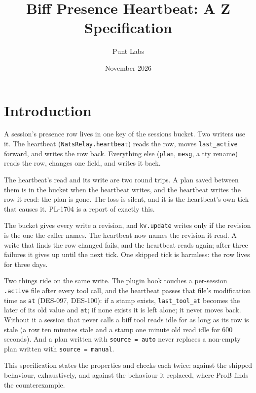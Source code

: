 \documentclass[a4paper,10pt,fleqn]{article}
\begin{document}
\title{Biff Presence Heartbeat: A Z Specification}
\author{Punt Labs}
\date{November 2026}
\maketitle

\section{Introduction}

A session's presence row lives in one key of the sessions bucket.  Two
writers use it.  The heartbeat (\texttt{NatsRelay.heartbeat}) reads the row,
moves \texttt{last\_active} forward, and writes the row back.  Everything
else (\texttt{plan}, \texttt{mesg}, a tty rename) reads the row, changes one
field, and writes it back.

The heartbeat's read and its write are two round trips.  A plan saved
between them is in the bucket when the heartbeat writes, and the heartbeat
writes the row it read: the plan is gone.  The loss is silent, and it is
the heartbeat's own tick that causes it.  PL-1704 is a report of exactly this.

The bucket gives every write a revision, and \texttt{kv.update} writes only
if the revision is the one the caller names.  The heartbeat now names the
revision it read.  A write that finds the row changed fails, and the
heartbeat reads again; after three failures it gives up until the next tick.
One skipped tick is harmless: the row lives for three days.

Two things ride on the same write.  The plugin hook touches a per-session
\texttt{.active} file after every tool call, and the heartbeat passes that
file's modification time as \texttt{at} (DES-097, DES-100): if a stamp exists,
\texttt{last\_tool\_at} becomes the later of its old value and \texttt{at}; if
none exists it is left alone; it never moves back.  Without it a session that
never calls a biff tool reads idle for as long as its row is stale (a row ten
minutes stale and a stamp one minute old read idle for 600 seconds).  And a
plan written with \texttt{source = auto} never replaces a non-empty plan
written with \texttt{source = manual}.

This specification states the properties and checks each twice: against the
shipped behaviour, exhaustively, and against the behaviour it replaced, where
ProB finds the counterexample.
\end{document}
